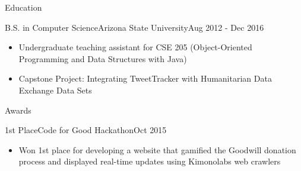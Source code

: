 \documentclass[]{mcdowellcv}
\begin{document}
	\begin{cvsection}{Education}
		\begin{cvsubsection}{B.S. in Computer Science}{Arizona State University}{Aug 2012 - Dec 2016}
			\begin{itemize}
				\item Undergraduate teaching assistant for CSE 205 (Object-Oriented Programming and Data Structures with Java)
				\item Capstone Project: Integrating TweetTracker with Humanitarian Data Exchange Data Sets
			\end{itemize}
		\end{cvsubsection}
	\end{cvsection}
	\begin{cvsection}{Awards}
		\begin{cvsubsection}{1st Place}{Code for Good Hackathon}{Oct 2015}
			\begin{itemize}
				\item Won 1st place for developing a website that gamified the Goodwill donation process and displayed real-time updates using Kimonolabs web crawlers
			\end{itemize}
		\end{cvsubsection}
	\end{cvsection}
\end{document}
